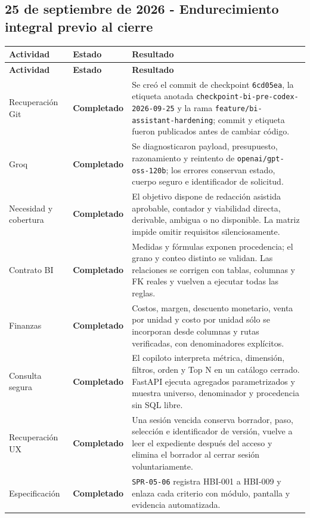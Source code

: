 \documentclass[11pt,letterpaper]{article}
\newcommand{\statusok}{\textcolor{deepgreen}{\textbf{Completado}}}
\newcommand{\file}[1]{\texttt{#1}}
\begin{document}
\subsection{25 de septiembre de 2026 - Endurecimiento integral previo al cierre}

\begin{longtable}{@{}p{}p{}p{}@{}}
  \toprule
  \textbf{Actividad} & \textbf{Estado} & \textbf{Resultado} \\
  \midrule
  \endfirsthead
  \toprule
  \textbf{Actividad} & \textbf{Estado} & \textbf{Resultado} \\
  \midrule
  \endhead
  Recuperación Git & \statusok & Se creó el commit de checkpoint \file{6cd05ea}, la etiqueta anotada \file{checkpoint-bi-pre-codex-2026-09-25} y la rama \file{feature/bi-assistant-hardening}; commit y etiqueta fueron publicados antes de cambiar código. \\
  Groq & \statusok & Se diagnosticaron payload, presupuesto, razonamiento y reintento de \file{openai/gpt-oss-120b}; los errores conservan estado, cuerpo seguro e identificador de solicitud. \\
  Necesidad y cobertura & \statusok & El objetivo dispone de redacción asistida aprobable, contador y viabilidad directa, derivable, ambigua o no disponible. La matriz impide omitir requisitos silenciosamente. \\
  Contrato BI & \statusok & Medidas y fórmulas exponen procedencia; el grano y conteo distinto se validan. Las relaciones se corrigen con tablas, columnas y FK reales y vuelven a ejecutar todas las reglas. \\
  Finanzas & \statusok & Costos, margen, descuento monetario, venta por unidad y costo por unidad sólo se incorporan desde columnas y rutas verificadas, con denominadores explícitos. \\
  Consulta segura & \statusok & El copiloto interpreta métrica, dimensión, filtros, orden y Top N en un catálogo cerrado. FastAPI ejecuta agregados parametrizados y muestra universo, denominador y procedencia sin SQL libre. \\
  Recuperación UX & \statusok & Una sesión vencida conserva borrador, paso, selección e identificador de versión, vuelve a leer el expediente después del acceso y elimina el borrador al cerrar sesión voluntariamente. \\
  Especificación & \statusok & \file{SPR-05-06} registra HBI-001 a HBI-009 y enlaza cada criterio con módulo, pantalla y evidencia automatizada. \\
  \bottomrule
\end{longtable}
\end{document}
